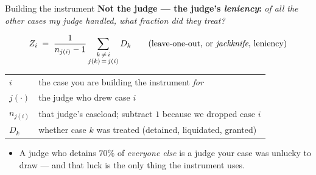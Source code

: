 \documentclass[
  11pt,
  ignorenonframetext,
  aspectratio=169,
]{beamer}
\providecommand{\tightlist}{%
  \setlength{\itemsep}{0pt}\setlength{\parskip}{0pt}}
\begin{document}
\begin{frame}{Building the instrument}
\protect{}\label{building-the-instrument}
\textbf{Not the judge --- the judge's \emph{leniency}:} \emph{of all the
other cases my judge handled, what fraction did they treat?}

\[
Z_i \;=\; \frac{1}{n_{j(i)} - 1} \sum_{\substack{k \,\neq\, i \\ j(k) \,=\, j(i)}} D_k
\qquad \text{(leave-one-out, or \emph{jackknife}, leniency)}
\]

\vspace{-0.5em}

\begin{center}\footnotesize
\begin{tabular}{ll}
$i$ & the case you are building the instrument \emph{for} \\
$j(\cdot)$ & the judge who drew case $i$ \\
$n_{j(i)}$ & that judge's caseload; subtract $1$ because we dropped case $i$ \\
$D_k$ & whether case $k$ was treated (detained, liquidated, granted) \\
\end{tabular}
\end{center}

\vspace{-0.2em}

\begin{itemize}
\tightlist
\item
  A judge who detains \(70\%\) of \emph{everyone else} is a judge your
  case was unlucky to draw --- and that luck is the only thing the
  instrument uses.
\end{itemize}
\end{frame}
\end{document}
